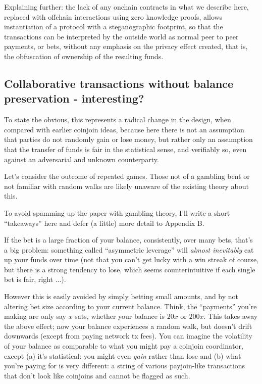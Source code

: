 \documentclass[11pt]{article}
\begin{document}
Explaining further: the lack of any onchain contracts in what we describe here, replaced with offchain interactions using zero knowledge proofs, allows instantiation of a protocol with a steganographic footprint, so that the transactions can be interpreted by the outside world as normal peer to peer payments, or bets, without any emphasis on the privacy effect created, that is, the obfuscation of ownership of the resulting funds.

\subsection{Collaborative transactions without balance preservation - interesting?}

To state the obvious, this represents a radical change in the design, when compared with earlier coinjoin ideas, because here there is not an assumption that parties do not randomly gain or lose money, but rather only an assumption that the transfer of funds is fair in the statistical sense, and verifiably so, even against an adversarial and unknown counterparty.

Let's consider the outcome of repeated games. Those not of a gambling bent or not familiar with random walks are likely unaware of the existing theory about this.

To avoid spamming up the paper with gambling theory, I'll write a short ``takeaways'' here and defer (a little) more detail to Appendix B.

If the bet is a large fraction of your balance, consistently, over many bets, that's a big problem: something called ``asymmetric leverage'' will \emph{almost inevitably} eat up your funds over time (not that you can't get lucky with a win streak of course, but there is a strong tendency to lose, which seems counterintuitive if each single bet is fair, right ...).

However this is easily avoided by simply betting small amounts, and by not altering bet size according to your current balance. Think, the ``payments'' you're making are only say $x$ sats, whether your balance is $20x$ or $200x$. This takes away the above effect; now your balance experiences a random walk, but doesn't drift downwards (except from paying network tx fees). You can imagine the volatility of your balance as comparable to what you might pay a coinjoin coordinator, except (a) it's statistical: you might even \emph{gain} rather than lose and (b) what you're paying for is very different: a string of various payjoin-like transactions that don't look like coinjoins and cannot be flagged as such.
\end{document}

